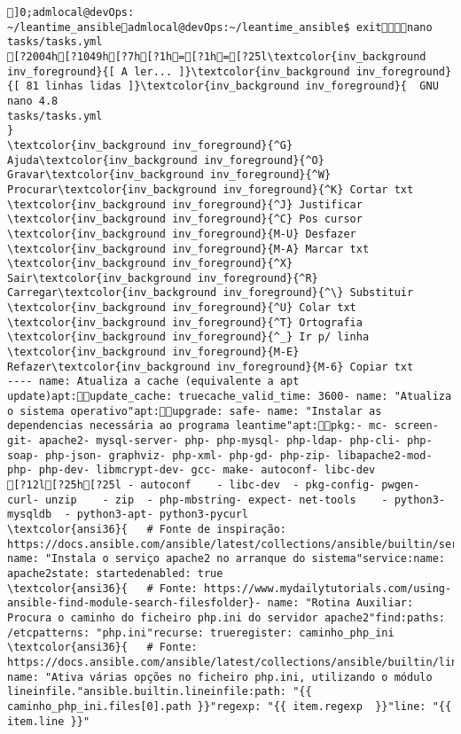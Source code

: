 \documentclass{scrartcl}
\title{}
\begin{document}
\begin{Verbatim}
]0;admlocal@devOps: ~/leantime_ansibleadmlocal@devOps:~/leantime_ansible$ exitnano tasks/tasks.yml 
[?2004h[?1049h[?7h[?1h=[?1h=[?25l\textcolor{inv_background inv_foreground}{[ A ler... ]}\textcolor{inv_background inv_foreground}{[ 81 linhas lidas ]}\textcolor{inv_background inv_foreground}{  GNU nano 4.8                                                tasks/tasks.yml                                                             }
\textcolor{inv_background inv_foreground}{^G} Ajuda\textcolor{inv_background inv_foreground}{^O} Gravar\textcolor{inv_background inv_foreground}{^W} Procurar\textcolor{inv_background inv_foreground}{^K} Cortar txt    \textcolor{inv_background inv_foreground}{^J} Justificar    \textcolor{inv_background inv_foreground}{^C} Pos cursor    \textcolor{inv_background inv_foreground}{M-U} Desfazer     \textcolor{inv_background inv_foreground}{M-A} Marcar txt
\textcolor{inv_background inv_foreground}{^X} Sair\textcolor{inv_background inv_foreground}{^R} Carregar\textcolor{inv_background inv_foreground}{^\} Substituir    \textcolor{inv_background inv_foreground}{^U} Colar txt     \textcolor{inv_background inv_foreground}{^T} Ortografia    \textcolor{inv_background inv_foreground}{^_} Ir p/ linha   \textcolor{inv_background inv_foreground}{M-E} Refazer\textcolor{inv_background inv_foreground}{M-6} Copiar txt
---- name: Atualiza a cache (equivalente a apt update)apt:update_cache: truecache_valid_time: 3600- name: "Atualiza o sistema operativo"apt:upgrade: safe- name: "Instalar as dependencias necessária ao programa leantime"apt:pkg:- mc- screen- git- apache2- mysql-server- php- php-mysql- php-ldap- php-cli- php-soap- php-json- graphviz- php-xml- php-gd- php-zip- libapache2-mod-php- php-dev- libmcrypt-dev- gcc- make- autoconf- libc-dev
[?12l[?25h[?25l - autoconf    - libc-dev  - pkg-config- pwgen- curl- unzip    - zip  - php-mbstring- expect- net-tools    - python3-mysqldb  - python3-apt- python3-pycurl
\textcolor{ansi36}{   # Fonte de inspiração: https://docs.ansible.com/ansible/latest/collections/ansible/builtin/service_module.html}- name: "Instala o serviço apache2 no arranque do sistema"service:name: apache2state: startedenabled: true
\textcolor{ansi36}{   # Fonte: https://www.mydailytutorials.com/using-ansible-find-module-search-filesfolder}- name: "Rotina Auxiliar: Procura o caminho do ficheiro php.ini do servidor apache2"find:paths: /etcpatterns: "php.ini"recurse: trueregister: caminho_php_ini
\textcolor{ansi36}{   # Fonte: https://docs.ansible.com/ansible/latest/collections/ansible/builtin/lineinfile_module.html}- name: "Ativa várias opções no ficheiro php.ini, utilizando o módulo lineinfile."ansible.builtin.lineinfile:path: "{{ caminho_php_ini.files[0].path }}"regexp: "{{ item.regexp  }}"line: "{{ item.line }}"

\end{Verbatim}
\end{document}
